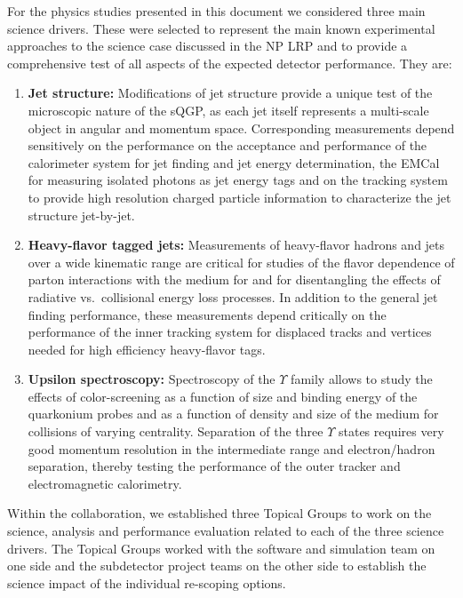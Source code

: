 For the physics studies presented in this document we considered three
main science drivers. These were selected to represent the main known 
experimental approaches to the science case discussed in the NP LRP and
to provide a comprehensive test of all aspects of the expected detector
performance. They are:
\begin{enumerate}
\item {\bf Jet structure:} Modifications of jet structure provide a unique test
of the microscopic nature of the sQGP, as each jet itself represents a multi-scale
object in angular and momentum space. Corresponding measurements depend
sensitively on the performance on the acceptance and performance 
of the calorimeter system for jet finding and jet energy determination, the
EMCal for measuring isolated photons as jet energy tags and on the tracking
system to provide high resolution charged particle information to characterize
the jet structure jet-by-jet.
\item {\bf Heavy-flavor tagged jets:} Measurements of heavy-flavor hadrons 
and jets over a wide kinematic range are critical for studies of
the flavor dependence of parton interactions with the medium for and for 
disentangling the effects of radiative vs.\ collisional energy loss processes.
In addition to the general jet finding performance, these measurements depend 
critically on the performance of the inner tracking system for displaced 
tracks and vertices needed for high efficiency heavy-flavor tags.
\item {\bf Upsilon spectroscopy:} Spectroscopy of the $\Upsilon$ family allows
to study the effects of color-screening as a function of size and 
binding energy of the quarkonium probes and as a function of density and size
of the medium for collisions of varying centrality. Separation of the three 
$\Upsilon$ states requires very good momentum resolution in the intermediate
\pt range and electron/hadron separation, thereby testing the performance of 
the outer tracker and electromagnetic calorimetry. 
\end{enumerate}

Within the collaboration, we established three Topical Groups to work 
on the science, analysis and performance evaluation related to each of the 
three science drivers. The Topical Groups worked with the software and simulation
team on one side and the subdetector project teams on the other side to 
establish the science impact of the individual re-scoping options.





